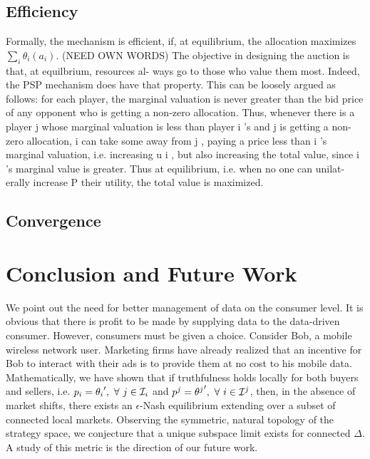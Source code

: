 \subsection{Efficiency}

Formally, the
mechanism is efficient, if, at equilibrium, the allocation maximizes
$\sum_i\theta_i(a_i)$.
(NEED OWN WORDS)
The objective in designing the auction is that, at equilbrium, resources al-
ways go to those who value them most. Indeed, the PSP mechanism does
have that property. This can be loosely argued as follows: for each player,
the marginal valuation is never greater than the bid price of any opponent
who is getting a non-zero allocation. Thus, whenever there is a player j
whose marginal valuation is less than player i 's and j is getting a non-zero
allocation, i can take some away from j , paying a price less than i 's marginal
valuation, i.e. increasing u i , but also increasing the total value, since i 's
marginal value is greater. Thus at equilibrium, i.e. when no one can unilat-
erally increase P their utility, the total value is maximized.

\subsection{Convergence}

\section{Conclusion and Future Work}

We point out the need for better management of data on the consumer
level. It is obvious that there is profit to be made by
supplying data to the data-driven consumer. However, consumers must be given a
choice. Consider Bob, a mobile wireless network user. Marketing firms have already realized that an incentive
for Bob to interact with their ads is to provide them at no cost to his mobile data. 
Mathematically, we have shown that if truthfulness holds locally for both buyers and sellers, i.e.
$p_i ={\theta_i}', \ \forall \ j \in \mathcal{I}_i$ and $p^j = {\theta^j}', \ \forall \
i \in\mcI^j$, then, in the absence of market shifts,
there exists an $\epsilon$-Nash equilibrium extending over a subset of connected
local markets. Observing the symmetric, natural topology of the strategy space,
we conjecture that a unique subspace limit exists for connected $\Delta$. A
study of this metric is the direction of our future work.

